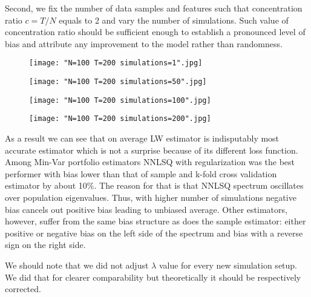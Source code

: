 \documentclass{article}
\begin{document}
Second, we fix the number of data samples and features such that concentration ratio $ c = T/N $ equals to 2 and vary the number of simulations. Such value of concentration ratio should be sufficient enough to establish a pronounced level of bias and attribute any improvement to the model rather than randomness. 

\begin{subfigures}


\begin{figure}[H]
\centering
  \texttt{[image: "N=100 T=200 simulations=1".jpg]}
  \caption{\label{first}}
  \label{pca}
\end{figure}

\begin{figure}[H]
\centering
  \texttt{[image: "N=100 T=200 simulations=50".jpg]}
  \caption{\label{second}}
  \label{pca}
\end{figure}

\begin{figure}[H]
\centering
  \texttt{[image: "N=100 T=200 simulations=100".jpg]}
  \caption{\label{third}}
  \label{pca}
\end{figure}

\begin{figure}[H]
\centering
  \texttt{[image: "N=100 T=200 simulations=200".jpg]}
  \caption{\label{fourth}}
  \label{pca}
\end{figure}

\end{subfigures}

As a result we can see that on average LW estimator is indisputably most accurate estimator which is not a surprise because of its different loss function. Among Min-Var portfolio estimators NNLSQ with regularization was the best performer with bias lower than that of sample and k-fold cross validation estimator by about 10\%. The reason for that is that NNLSQ spectrum oscillates over population eigenvalues. Thus, with higher number of simulations negative bias cancels out positive bias leading to unbiased average. Other estimators, however, suffer from the same bias structure as does the sample estimator: either positive or negative bias on the left side of the spectrum and bias with a reverse sign on the right side.

We should note that we did not adjust $\lambda$ value for every new simulation setup. We did that for clearer comparability but theoretically it should be respectively corrected. 
\end{document}
